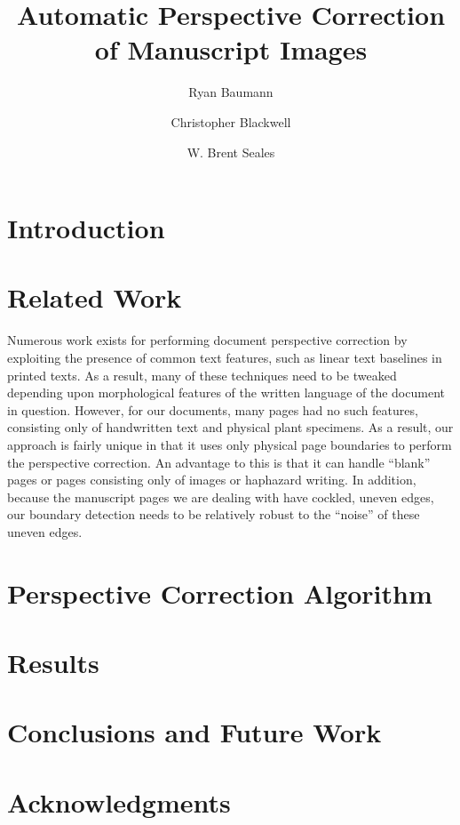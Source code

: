 \documentclass[runningheads,a4paper]{llncs}
\begin{document}
\mainmatter

\title{Automatic Perspective Correction of Manuscript Images}

\author{Ryan Baumann \and Christopher Blackwell \and W. Brent Seales}


\maketitle

\section{Introduction}

\section{Related Work}

Numerous work exists for performing document perspective correction by exploiting the presence of
common text features, such as linear text baselines in printed texts.
As a result, many of these techniques need to be tweaked depending upon morphological features of
the written language of the document in question.
However, for our documents,
many pages had no such features, consisting only of handwritten text and physical plant
specimens. As a result, our approach is fairly unique in that it uses only physical page boundaries to
perform the perspective correction. An advantage to this is that it can handle “blank” pages or pages
consisting only of images or haphazard writing. In addition, because the manuscript pages we are dealing with have
cockled, uneven edges, our boundary detection needs to be relatively robust to the “noise” of these uneven edges.

\section{Perspective Correction Algorithm}

\section{Results}

\section{Conclusions and Future Work}

\section{Acknowledgments}
\end{document}
